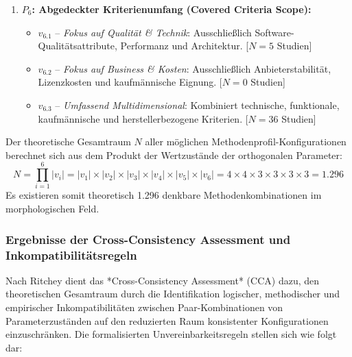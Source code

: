 \begin{enumerate}
    \item \textbf{$P_6$: Abgedeckter Kriterienumfang (Covered Criteria Scope):}
    \begin{itemize}
        \item $v_{6.1}$ -- \textit{Fokus auf Qualität \& Technik}: Ausschließlich Software-Qualitätsattribute, Performanz und Architektur. [$N = 5$ Studien]
        \item $v_{6.2}$ -- \textit{Fokus auf Business \& Kosten}: Ausschließlich Anbieterstabilität, Lizenzkosten und kaufmännische Eignung. [$N = 0$ Studien]
        \item $v_{6.3}$ -- \textit{Umfassend Multidimensional}: Kombiniert technische, funktionale, kaufmännische und herstellerbezogene Kriterien. [$N = 36$ Studien]
    \end{itemize}
\end{enumerate}

Der theoretische Gesamtraum $N$ aller möglichen Methodenprofil-Konfigurationen berechnet sich aus dem Produkt der Wertzustände der orthogonalen Parameter:
\begin{equation}
N = \prod_{i=1}^{6} |v_i| = |v_1| \times |v_2| \times |v_3| \times |v_4| \times |v_5| \times |v_6| = 4 \times 4 \times 3 \times 3 \times 3 \times 3 = 1.296
\end{equation}
Es existieren somit theoretisch 1.296 denkbare Methodenkombinationen im morphologischen Feld.

\subsubsection{Ergebnisse der Cross-Consistency Assessment und Inkompatibilitätsregeln}

Nach Ritchey dient das *Cross-Consistency Assessment* (CCA) dazu, den theoretischen Gesamtraum durch die Identifikation logischer, methodischer und empirischer Inkompatibilitäten zwischen Paar-Kombinationen von Parameterzuständen auf den reduzierten Raum konsistenter Konfigurationen einzuschränken. Die formalisierten Unvereinbarkeitsregeln stellen sich wie folgt dar:

